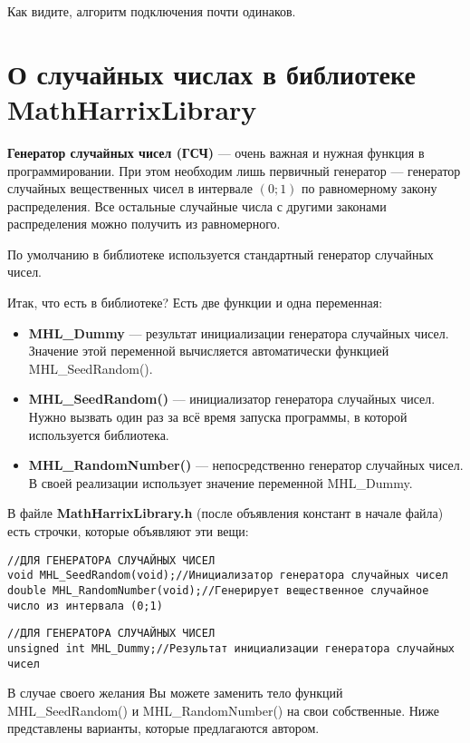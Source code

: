 \documentclass[a4paper,12pt]{article}
\begin{document}
Как видите, алгоритм подключения почти одинаков.

\newpage
\section{О случайных числах в библиотеке MathHarrixLibrary}\label{section_random}

\textbf{Генератор случайных чисел (ГСЧ)} --- очень важная и нужная функция в программировании. При этом необходим лишь первичный генератор --- генератор случайных вещественных чисел в интервале $\left( 0; 1\right)$ по равномерному закону распределения. Все остальные случайные числа с другими законами распределения можно получить из равномерного.

По умолчанию в библиотеке используется стандартный генератор случайных чисел.


Итак, что есть в библиотеке? Есть две функции и одна переменная:
\begin{itemize}
\item \textbf{MHL\_Dummy} --- результат инициализации генератора случайных чисел. Значение этой переменной вычисляется автоматически функцией MHL\_SeedRandom().
\item \textbf{MHL\_SeedRandom()} --- инициализатор генератора случайных чисел. Нужно вызвать один раз за всё время запуска программы, в которой используется библиотека.
\item \textbf{MHL\_RandomNumber()} --- непосредственно генератор случайных чисел. В своей реализации использует значение переменной MHL\_Dummy.
\end{itemize}

В файле \textbf{MathHarrixLibrary.h} (после объявления констант в начале файла) есть строчки, которые объявляют эти вещи:
\begin{lstlisting}[label=random_h,caption=Объявление функций в MathHarrixLibrary.h]
//ДЛЯ ГЕНЕРАТОРА СЛУЧАЙНЫХ ЧИСЕЛ
void MHL_SeedRandom(void);//Инициализатор генератора случайных чисел
double MHL_RandomNumber(void);//Генерирует вещественное случайное число из интервала (0;1)
\end{lstlisting}

\begin{lstlisting}[label=random_h_cpp,caption=Объявление переменной в MathHarrixLibrary.cpp]
//ДЛЯ ГЕНЕРАТОРА СЛУЧАЙНЫХ ЧИСЕЛ
unsigned int MHL_Dummy;//Результат инициализации генератора случайных чисел
\end{lstlisting}

В случае своего желания Вы можете заменить тело функций MHL\_SeedRandom() и MHL\_RandomNumber() на свои собственные. Ниже представлены варианты, которые предлагаются автором.
\end{document}

